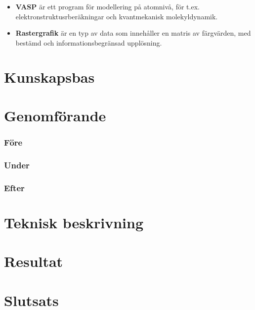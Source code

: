 \documentclass[a4paper,12pt]{article}
\begin{document}
\begin{itemize}
\item \textbf{VASP} är ett program för modellering på atomnivå, för t.ex. elektronstruktusrberäkningar och kvantmekanisk molekyldynamik.
\cite{VASP}

\item \textbf{Rastergrafik} är en typ av data som innehåller en matris av färgvärden, med bestämd och informationsbegränsad upplösning.
\cite{raster}


\end{itemize}

\section{Kunskapsbas}
\label{lunskapsbas}

\section{Genomförande}
\subsubsection{Före}
\subsubsection{Under}
\subsubsection{Efter}

\section{Teknisk beskrivning}

\section{Resultat}

\section{Slutsats}
\end{document}

